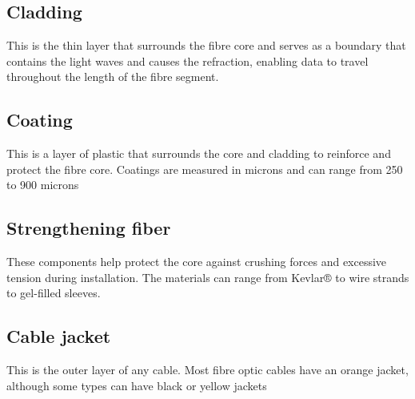 \documentclass[12pt]{report}
\begin{document}
	\subsection*{Cladding}
	This is the thin layer that surrounds the fibre core and serves as a boundary that contains the light waves and causes the refraction, enabling data to travel throughout the length of the fibre segment. 
	\subsection*{Coating}
	This is a layer of plastic that surrounds the core and cladding to reinforce and protect the fibre core. Coatings are measured in microns and can range from 250 to 900 microns
	\subsection*{ Strengthening fiber } 
	These components help protect the core against crushing forces and excessive tension during installation. The materials can range from Kevlar® to wire strands to gel-filled sleeves. 
	\subsection*{Cable jacket}
	This is the outer layer of any cable. Most fibre optic cables have an orange jacket, although some types can have black or yellow jackets
\end{document}
